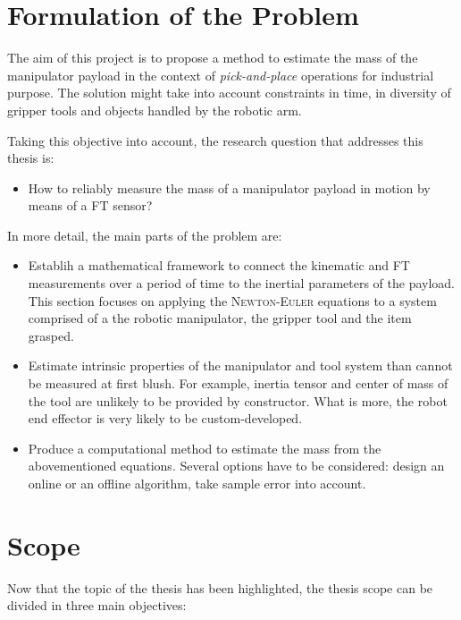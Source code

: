 \documentclass[/home/francois/latex/report/main.tex]{subfiles}
\begin{document}
\section{Formulation of the Problem}

The aim of this project is to propose a method to estimate the mass of the manipulator payload in the context of \textit{pick-and-place} operations for industrial purpose. The solution might take into account constraints in time, in diversity of gripper tools and objects handled by the robotic arm.

Taking this objective into account, the research question that addresses this thesis is:

\begin{itemize}%
  \renewcommand{\labelitemi}{$\Rightarrow$}
 \item How to reliably measure the mass of a manipulator payload in motion by means of a \ac{FT} sensor?
\end{itemize}

In more detail, the main parts of the problem are:

\begin{itemize}
 \item Establih a mathematical framework to connect the kinematic and \ac{FT} measurements over a period of time to the inertial parameters of the payload. This section focuses on applying the \textsc{Newton-Euler} equations to a system comprised of a the robotic manipulator, the gripper tool and the item grasped.
 \item Estimate intrinsic properties of the manipulator and tool system than cannot be measured at first blush. For example, inertia tensor and center of mass of the tool are unlikely to be provided by constructor. What is more, the robot end effector is very likely to be custom-developed.
 \item Produce a computational method to estimate the mass from the abovementioned equations. Several options have to be considered: design an online or an offline algorithm, take sample error into account.
\end{itemize}

\section{Scope}

Now that the topic of the thesis has been highlighted, the thesis scope can be divided in three main objectives:
\end{document}
